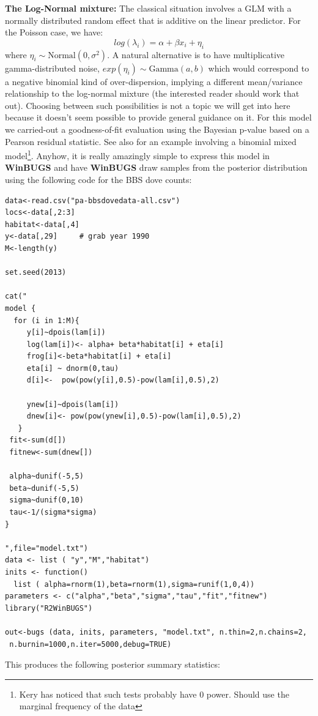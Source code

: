 {\bf The Log-Normal mixture:} The classical situation involves a GLM
with a normally distributed random effect that is additive on the
linear predictor. For the Poisson case, we have:
\[
 	log(\lambda_{i}) = \alpha  + \beta x_{i} + \eta_{i}
\]
where $\eta_{i} \sim \mbox{Normal}(0,\sigma^{2})$.  A natural
alternative is to have multiplicative gamma-distributed noise,
$exp(\eta_{i}) \sim  \mbox{Gamma}(a,b)$ which would correspond to a
negative binomial kind of over-dispersion, implying a different
mean/variance relationship to the log-normal mixture (the interested
reader should work that out).   Choosing between such possibilities is
not a topic we will get into here because it doesn't seem possible to
provide general guidance on it.
For this model we carried-out a goodness-of-fit evaluation using the
Bayesian p-value based on a Pearson residual statistic. See also
\citep[][ch. 18]{kery:2010}
for an example involving a binomial mixed model\footnote{Kery has
  noticed that such tests probably have 0 power. Should use the
  marginal frequency of the data}.
 Anyhow, it is really amazingly simple
to express this model in {\bf WinBUGS} and have {\bf WinBUGS}  draw samples from the posterior distribution using the following code for the BBS dove counts:
{\small
\begin{verbatim}
data<-read.csv("pa-bbsdovedata-all.csv")
locs<-data[,2:3]
habitat<-data[,4]
y<-data[,29]     # grab year 1990
M<-length(y)

set.seed(2013)

cat("
model {
  for (i in 1:M){
     y[i]~dpois(lam[i])
     log(lam[i])<- alpha+ beta*habitat[i] + eta[i]
     frog[i]<-beta*habitat[i] + eta[i]
     eta[i] ~ dnorm(0,tau)
     d[i]<-  pow(pow(y[i],0.5)-pow(lam[i],0.5),2)

     ynew[i]~dpois(lam[i])
     dnew[i]<- pow(pow(ynew[i],0.5)-pow(lam[i],0.5),2)
   }
 fit<-sum(d[])
 fitnew<-sum(dnew[])

 alpha~dunif(-5,5)
 beta~dunif(-5,5)
 sigma~dunif(0,10)
 tau<-1/(sigma*sigma)
}

",file="model.txt")
data <- list ( "y","M","habitat")
inits <- function()
  list ( alpha=rnorm(1),beta=rnorm(1),sigma=runif(1,0,4))
parameters <- c("alpha","beta","sigma","tau","fit","fitnew")
library("R2WinBUGS")

out<-bugs (data, inits, parameters, "model.txt", n.thin=2,n.chains=2,
 n.burnin=1000,n.iter=5000,debug=TRUE)
\end{verbatim}
}
This produces the following posterior summary statistics:
